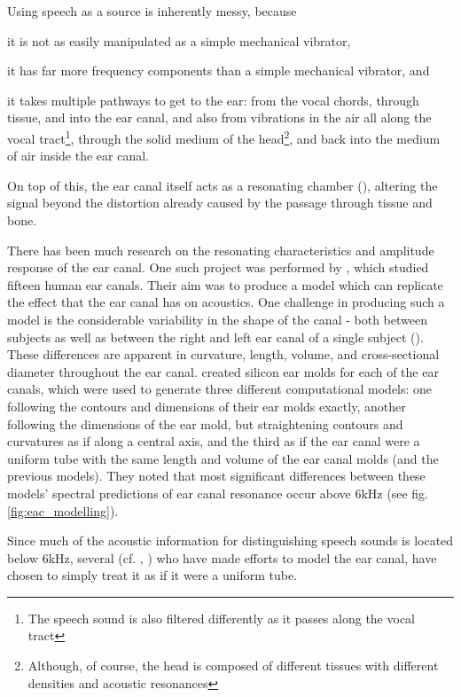 \documentclass[dissertation,copyright]{uathesis}
\begin{document}
Using speech as a source is inherently messy, because 
\begin{enumerate*}[label={\alph*)}]
  \item  it is not as easily manipulated as a simple mechanical vibrator,
  \item  it has far more frequency components than a simple mechanical vibrator, and 
  \item  it takes multiple pathways to get to the ear: from the vocal chords, through tissue, and into the ear canal, and also from vibrations in the air all along the vocal tract\footnote{The speech sound is also filtered differently as it passes along the vocal tract}, through the solid medium of the head\footnote{Although, of course, the head is composed of different tissues with different densities and acoustic resonances}, and back into the medium of air inside the ear canal.
\end{enumerate*}
On top of this, the ear canal itself acts as a resonating chamber (\cite{rosen:91}), altering the signal beyond the distortion already caused by the passage through tissue and bone.  

There has been much research on the resonating characteristics and amplitude response of the ear canal.  One such project was performed by \cite{stinson:89}, which studied fifteen human ear canals.  Their aim was to produce a model which can replicate the effect that the ear canal has on acoustics.
One challenge in producing such a model is the considerable variability in the shape of the canal - both between subjects as well as between the right and left ear canal of a single subject (\cite{stinson:89}).  These differences are apparent in curvature, length, volume, and cross-sectional diameter throughout the ear canal.  \cite{stinson:89} created silicon ear molds for each of the ear canals, which were used to generate three different computational models: one following the contours and dimensions of their ear molds exactly, another following the dimensions of the ear mold, but straightening contours and curvatures as if along a central axis, and the third as if the ear canal were a uniform tube with the same length and volume of the ear canal molds (and the previous models).  They noted that most significant differences between these models' spectral predictions of ear canal resonance occur above 6kHz (see fig. \ref{fig:eac_modelling}).  

Since much of the acoustic information for distinguishing speech sounds is located below 6kHz, several (cf. \cite{stinson:89}, \cite{hansen:97b} \cite{stenfelt:07}) who have made efforts to model the ear canal, have chosen to simply treat it as if it were a uniform tube.
\end{document}
